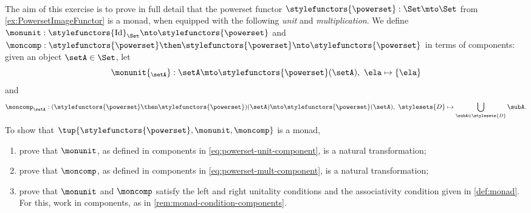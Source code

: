 \

\begin{gradedexercise}\label{ex:PowersetMonad}
The aim of this exercise is to prove in full detail that the powerset functor $\stylefunctors{\powerset} : \Set \mto \Set$ from \cref{ex:PowersetImageFunctor} is a monad, when equipped with the following \emph{unit} and \emph{multiplication}. We define $\monunit : \stylefunctors{\text{Id}}_{\Set}  \nto \stylefunctors{\powerset}$ and $\moncomp : \stylefunctors{\powerset} \then \stylefunctors{\powerset} \nto \stylefunctors{\powerset}$ in terms of components: given an object $\setA \in \Set$, let 
\begin{equation}\label{eq:powerset-unit-component}
\monunit{_\setA} : \setA \mto \stylefunctors{\powerset}(\setA), \ \ela \mapsto \{ \ela \}
\end{equation}
and 
\begin{equation}\label{eq:powerset-mult-component}
\moncomp_{\setA} : (\stylefunctors{\powerset} \then \stylefunctors{\powerset})(\setA) \mto \stylefunctors{\powerset}(\setA), \ \stylesets{D} \mapsto \bigcup_{\subA \in \stylesets{D}} \subA.
\end{equation}
To show that $\tup{\stylefunctors{\powerset}, \monunit, \moncomp}$ is a monad, 
\begin{enumerate}
\item prove that $\monunit$, as defined in components in \cref{eq:powerset-unit-component}, is a natural transformation; 
\item prove that $\moncomp$, as defined in components in \cref{eq:powerset-mult-component}, is a natural transformation; 
\item prove that $\monunit$ and $\moncomp$ satisfy the left and right unitality conditions and the associativity condition given in \cref{def:monad}. For this, work in components, as in \cref{rem:monad-condition-components}.
\end{enumerate}
\end{gradedexercise}







